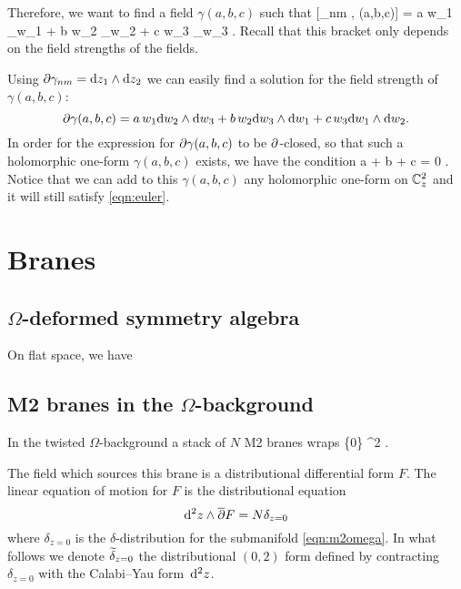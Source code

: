 \documentclass[11pt]{amsart}
\begin{document}

Therefore, we want to find a field $\gamma(a,b,c)$ such that
\beqn\label{eqn:euler}
[\gamma_{nm} , \gamma(a,b,c)] = a w_1 \del_{w_1} + b w_2 \del _{w_2} + c w_3 \del_{w_3} .
\eeqn
Recall that this bracket only depends on the field strengths of the fields. 

Using $\partial \gamma_{nm} = {\rm d} z_1 \wedge {\rm d} z_2$ we can easily find a solution for the field strength of $\gamma(a,b,c)$:
\[
\partial \gamma(a,b,c) = a \, w_1 {\rm d} w_2 \wedge {\rm d} w_3 + b \, w_2 {\rm d} w_3 \wedge {\rm d} w_1 + c \, w_3 {\rm d} w_1 \wedge {\rm d} w_2 .
\]
In order for the expression for $\partial \gamma(a,b,c)$ to be $\partial$-closed, so that such a holomorphic one-form $\gamma(a,b,c)$ exists, we have the condition
\beqn\label{eqn:abc}
a + b + c = 0 .
\eeqn
Notice that we can add to this $\gamma(a,b,c)$ any holomorphic one-form on $\mathbb C^2_z$ and it will still satisfy \eqref{eqn:euler}. 

 

\appendix 

\section{Branes}

\subsection{$\Omega$-deformed symmetry algebra}

On flat space, we have 



\subsection{M2 branes in the $\Omega$-background} 

\parsec[]

In the twisted $\Omega$-background a stack of $N$ M2 branes wraps 
\beqn\label{eqn:m2omega}
\{0\} \times \RR \subset \CC^2 \times \RR .
\eeqn

The field which sources this brane is a distributional differential form $F$.
The linear equation of motion for $F$ is the distributional equation 
\[
{\rm d}^2 z \wedge \overline{\partial} F = N \delta_{z=0} 
\]
where $\delta_{z=0}$ is the $\delta$-distribution for the submanifold \eqref{eqn:m2omega}.  
In what follows we denote $\widetilde{\delta}_{z=0}$ the distributional $(0,2)$ form defined by contracting $\delta_{z=0}$ with the Calabi--Yau form~${\rm d}^2 z$. 
\end{document}
